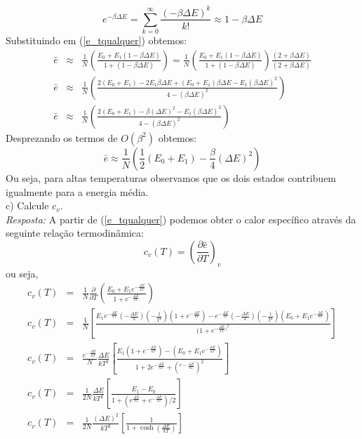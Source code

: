 \documentclass[11pt,leqno]{article}
\begin{document}
\begin{equation}
e^{-\beta \Delta E}=\sum_{k=0}^{\infty} \frac{(-\beta \Delta E)^{k}}{k!} \approx 1-\beta \Delta E
\nonumber
\end{equation}
Substituindo em (\ref{e_tqualquer}) obtemos:
\begin{eqnarray}
\bar{e} &\approx& \frac{1}{N} \left( \frac{E_{0} + E_{1}(1-\beta \Delta E)}{1+(1-\beta \Delta E)} \right)= \frac{1}{N} \left( \frac{E_{0} + E_{1}(1-\beta \Delta E)}{1+(1-\beta \Delta E)}\right) \frac{(2+\beta \Delta E)}{(2+\beta \Delta E)} \nonumber \\
\bar{e} &\approx& \frac{1}{N} \left( \frac{2 (E_{0} + E_{1}) - 2 E_{1} \beta \Delta E + (E_{0}+E_{1})\beta \Delta E-E_{1}(\beta \Delta E)^{2}}{4-(\beta \Delta E)^{2}} \right)\nonumber \\
\bar{e} &\approx& \frac{1}{N} \left( \frac{2 (E_{0} + E_{1}) -\beta (\Delta E)^{2}-E_{1}(\beta \Delta E)^{2}}{4-(\beta \Delta E)^{2}} \right) \nonumber
\end{eqnarray}
Desprezando os termos de $O(\beta^{2})$ obtemos:
\begin{equation}
\bar{e} \approx \frac{1}{N} \left( \frac{1}{2}(E_{0}+E_{1})-\frac{\beta}{4}(\Delta E)^{2} \right)
\label{e_tinfty}
\end{equation}
Ou seja, para altas temperaturas observamos que os dois estados contribuem igualmente para a energia média.\\
c) Calcule $c_{v}$.\\
{\it Resposta:} A partir de (\ref{e_tqualquer}) podemos obter o calor específico através da seguinte relação termodin\^amica:
\begin{equation}
c_{v}(T)= \left(\frac{\partial \bar{e}}{\partial T}\right)_{v}
\label{relacao}
\end{equation}
ou seja,
\begin{eqnarray}
c_{v}(T)&=&\frac{1}{N} \frac{\partial }{\partial T} \left( \frac{E_{0} + E_{1} e^{-\frac{\Delta E}{kT}}}{1 + e^{-\frac{\Delta E}{kT}}} \right) \nonumber\\
c_{v}(T)&=&\frac{1}{N} \left[ \frac{E_{1}e^{-\frac{\Delta E}{kT}}\left(-\frac{\Delta E}{k}\right)\left(-\frac{1}{T^{2}} \right) (1+ e^{-\frac{\Delta E}{kT}})
- e^{-\frac{\Delta E}{kT}}\left(-\frac{\Delta E}{k}\right)\left(-\frac{1}{T^{2}} \right) (E_{0} + E_{1} e^{-\frac{\Delta E}{kT}})}{(1 + e^{-\frac{\Delta E}{kT})^{2}}} \right] \nonumber \\
c_{v}(T)&=&\frac{e^{-\frac{\Delta E}{kT}}}{N} \frac{\Delta E }{k T^{2}} \left[ \frac{E_{1}(1+ e^{-\frac{\Delta E}{kT}})-(E_{0} + E_{1} e^{-\frac{\Delta E}{kT}})}{1+2e^{-\frac{\Delta E}{kT}}+ (^{e-\frac{\Delta E}{kT}})^{2}}\right]\nonumber \\
c_{v}(T)&=& \frac{1}{2N} \frac{\Delta E }{k T^{2}} \left[ \frac{E_{1}-E_{0}}{1 + (e^{\frac{\Delta E}{kT}}+e^{-\frac{\Delta E}{kT}}  )/2}\right] \nonumber \\
c_{v}(T)&=&\frac{1}{2N} \frac{(\Delta E)^{2} }{k T^{2}} \left[ \frac{1}{1+\cosh(\frac{\Delta E}{kT})}\right] \nonumber
\end{eqnarray}
\end{document}
